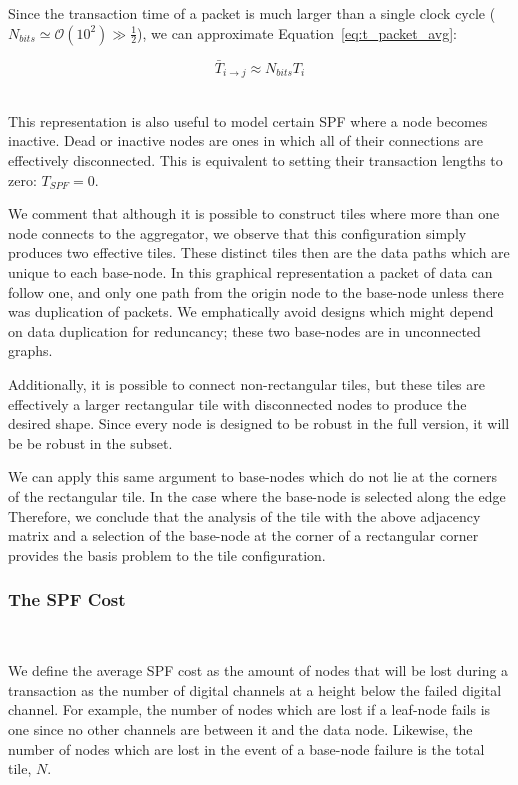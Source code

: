 Since the transaction time of a packet is much larger than a single clock cycle ($N_{bits} \simeq \mathcal{O}(10^{2}) \gg \frac{1}{2}$), we can approximate Equation~\ref{eq:t_packet_avg}:

\begin{equation}
\bar{T}_{i\rightarrow j} \approx N_{bits}T_{i}
\end{equation}~\label{eq:t_packet}

This representation is also useful to model certain SPF where a node becomes inactive.
Dead or inactive nodes are ones in which all of their connections are effectively disconnected.
This is equivalent to setting their transaction lengths to zero: $T_{SPF} = 0$.

We comment that although it is possible to construct tiles where more than one node connects to the aggregator, we observe that this configuration simply produces two effective tiles.
These distinct tiles then are the data paths which are unique to each base-node.
In this graphical representation a packet of data can follow one, and only one path from the origin node to the base-node unless there was duplication of packets.
We emphatically avoid designs which might depend on data duplication for reduncancy; these two base-nodes are in unconnected graphs.

Additionally, it is possible to connect non-rectangular tiles, but these tiles are effectively a larger rectangular tile with disconnected nodes to produce the desired shape.
Since every node is designed to be robust in the full version, it will be be robust in the subset.

We can apply this same argument to base-nodes which do not lie at the corners of the rectangular tile.
In the case where the base-node is selected along the edge
Therefore, we conclude that the analysis of the tile with the above adjacency matrix and a selection of the base-node at the corner of a rectangular corner provides the basis problem to the tile configuration.

\subsubsection{The SPF Cost}~\label{sec:spf_cost}

We define the average SPF cost as the amount of nodes that will be lost during a transaction as the number of digital channels at a height below the failed digital channel.
For example, the number of nodes which are lost if a leaf-node fails is one since no other channels are between it and the data node.
Likewise, the number of nodes which are lost in the event of a base-node failure is the total tile, $N$.

